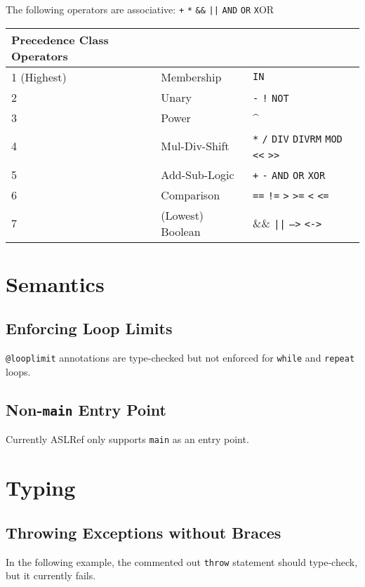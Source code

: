 \documentclass{book}
\begin{document}
The following operators are associative: \texttt{+} \texttt{*} \texttt{\&\&} \texttt{||} \texttt{AND} \texttt{OR} \texttt{X}OR

\begin{center}
\begin{tabular}{lll}
  \hline
Precedence Class Operators\\
\hline
1 (Highest) & Membership & \texttt{IN}\\
2 & Unary & \texttt{-} \texttt{!} \texttt{NOT}\\
3 & Power & \textasciicircum\\
4 & Mul-Div-Shift & \texttt{*} \texttt{/} \texttt{DIV} \texttt{DIVRM} \texttt{MOD} \texttt{<<} \texttt{>>}\\
5 & Add-Sub-Logic & \texttt{+} \texttt{-} \texttt{AND} \texttt{OR} \texttt{XOR}\\
6 & Comparison & \texttt{==} \texttt{!=} \texttt{>} \texttt{>=} \texttt{<} \texttt{<=}\\
7 & (Lowest) Boolean & \&\& \texttt{||} \texttt{-->} \texttt{<->}\\
\hline
\end{tabular}
\end{center}

\section{Semantics}

\subsection{Enforcing Loop Limits}
\verb|@looplimit| annotations are type-checked but not enforced for \texttt{while} and \texttt{repeat} loops.

\subsection{Non-\texttt{main} Entry Point}
Currently ASLRef only supports \texttt{main} as an entry point.

\section{Typing}

\subsection{Throwing Exceptions without Braces}
In the following example, the commented out \texttt{throw} statement should type-check,
but it currently fails.
\end{document}
